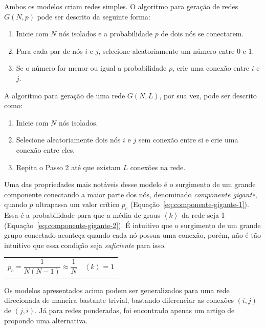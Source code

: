 \documentclass[12pt,a4paper,final]{article}
\newcommand{\avg}[1]{\left\langle #1 \right\rangle} %
\begin{document}
Ambos os modelos criam redes simples. O algoritmo para geração de redes $G(N, p)$ pode ser descrito da seguinte forma:

\begin{enumerate}
\item Inicie com $N$ nós isolados e a probabilidade $p$ de dois nós se conectarem.

\item Para cada par de nós $i$ e $j$, selecione aleatoriamente um número entre 0 e 1.

\item Se o número for menor ou igual a probabilidade $p$, crie uma conexão entre $i$ e $j$.
\end{enumerate}

A algoritmo para geração de uma rede $G(N, L)$, por sua vez,  pode ser descrito como:

\begin{enumerate}
\item Inicie com $N$ nós isolados.
\item Selecione aleatoriamente dois nós $i$ e $j$ sem conexão entre si e crie uma conexão entre eles.
\item Repita o Passo 2 até que existam $L$ conexões na rede.
\end{enumerate}

Uma das propriedades mais notáveis desse modelo é o surgimento de um grande componente conectando a maior parte dos nós, denominado \textit{componente gigante}, quando $p$ ultrapassa um valor crítico $p_c$ (Equação~\ref{eq:componente-gigante-1}). Essa é a probabilidade para que a média de graus $\avg{k}$ da rede seja 1 (Equação~\ref{eq:componente-gigante-2}). É intuitivo que o surgimento de um grande grupo conectado aconteça quando cada nó possua uma conexão, porém, não é tão intuitivo que essa condição seja \textit{suficiente} para isso.

\noindent
\begin{tabularx}{\linewidth}{@{}XX@{}}
    \begin{equation} \label{eq:componente-gigante-1}
        p_c = \frac{1}{N(N - 1)} \approx \frac{1}{N}
    \end{equation} &
    \begin{equation} \label{eq:componente-gigante-2}
        \avg{k} = 1
    \end{equation}
\end{tabularx}

Os modelos apresentados acima podem ser generalizados para uma rede direcionada de maneira bastante trivial, bastando diferenciar as conexões $(i, j)$ de $(j, i)$. Já para redes ponderadas, foi encontrado apenas um artigo de  propondo uma alternativa.
\end{document}

